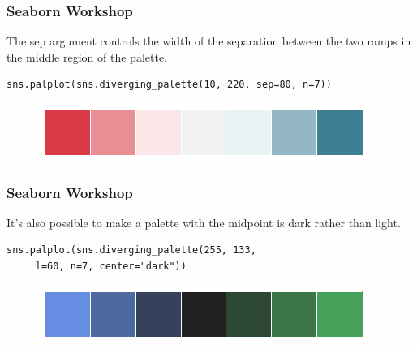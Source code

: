 \documentclass{beamer}
\begin{document}
\begin{frame}[fragile]
\frametitle{Seaborn Workshop}
\large


The sep argument controls the width of the separation between the two ramps in the middle region of the palette.
\begin{verbatim}
sns.palplot(sns.diverging_palette(10, 220, sep=80, n=7))
\end{verbatim}

\begin{figure}
	\centering
	\includegraphics[width=0.7\linewidth]{images/color_palettes_62_0}
\end{figure}
\end{frame}
\begin{frame}[fragile]
	\frametitle{Seaborn Workshop}
	\large
It’s also possible to make a palette with the midpoint is dark rather than light.
\begin{verbatim}
sns.palplot(sns.diverging_palette(255, 133, 
     l=60, n=7, center="dark"))
\end{verbatim}

\begin{figure}
	\centering
	\includegraphics[width=0.7\linewidth]{images/color_palettes_64_0}
\end{figure}

\end{frame}
\end{document}

